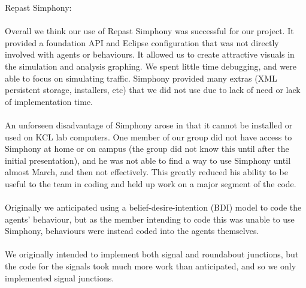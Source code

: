 \documentclass[11pt]{article}
\begin{document}
Repast Simphony:
\\ \\
Overall we think our use of Repast Simphony was successful for our project. It provided a foundation API and Eclipse configuration that was not directly involved with agents or behaviours. It allowed us to create attractive visuals in the simulation and analysis graphing. We spent little time debugging, and were able to focus on simulating traffic. Simphony provided many extras (XML persistent storage, installers, etc) that we did not use due to lack of need or lack of implementation time.
\\ \\
An unforseen disadvantage of Simphony arose in that it cannot be installed or used on KCL lab computers. One member of our group did not have access to Simphony at home or on campus (the group did not know this until after the initial presentation), and he was not able to find a way to use Simphony until almost March, and then not effectively. This greatly reduced his ability to be useful to the team in coding and held up work on a major segment of the code.
\\ \\
Originally we anticipated using a belief-desire-intention (BDI) model to code the agents’ behaviour, but as the member intending to code this was unable to use Simphony, behaviours were instead coded into the agents themselves.
\\ \\
We originally intended to implement both signal and roundabout junctions, but the code for the signals took much more work than anticipated, and so we only implemented signal junctions.
\\ \\
\end{document}
